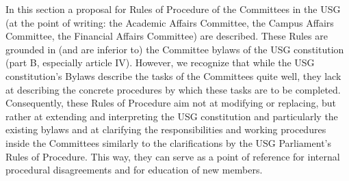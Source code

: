 In this section a proposal for Rules of Procedure of the Committees in the USG (at the point of writing: the Academic Affairs Committee, the Campus Affairs Committee, the Financial Affairs Committee) are described. These Rules are grounded in (and are inferior to) the Committee bylaws of the USG constitution (part B, especially article IV). However, we recognize that while the USG constitution's Bylaws describe the tasks of the Committees quite well, they lack at describing the concrete procedures by which these tasks are to be completed. Consequently, these Rules of Procedure aim not at modifying or replacing, but rather at extending and interpreting the USG constitution and particularly the existing bylaws and at clarifying the responsibilities and working procedures inside the Committees similarly to the clarifications by the USG Parliament's Rules of Procedure. 
This way, they can serve as a point of reference for internal procedural disagreements and for education of new members.


